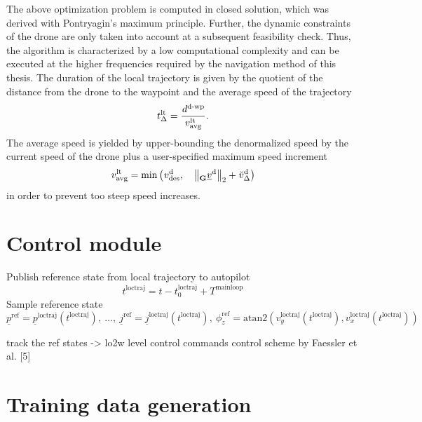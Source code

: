 The above optimization problem is 
computed in closed solution,
which was derived with Pontryagin's maximum principle.
Further, the dynamic constraints of the drone are only taken into account
at a subsequent feasibility check.
Thus, the algorithm is
characterized by a low computational complexity 
and can be executed at the higher frequencies required by the navigation method of this thesis.
The duration of the local trajectory is given by the quotient
of the distance from the drone to the waypoint and 
the average speed of the trajectory
\begin{equation}
    \dur[]{\loctraj}{}{}{}
    = 
    \frac{
        \dist[]{\dronetowayp}{}{}{}
    }{
        \speed[]{\loctraj}{\average}{}{}
    }.
\end{equation}
The average speed is yielded by upper-bounding
the denormalized speed 
by 
the current speed of the drone 
plus a user-specified maximum speed increment
\begin{equation}
    \speed[]{\loctraj}{\average}{}{}
    = 
    \minof{
        \speed[]{\drone}{\desired}{}{}
    }{
        \left\|
            \vel[]{\drone}{}{\grs}{}
        \right\|_2
        + 
        \speed[\user]{\drone}{\Delta}{}{}
    }
\end{equation}
in order to prevent too steep speed increases.


\section{Control module}


Publish reference state from local trajectory to autopilot
\begin{equation}
    t^\text{loctraj} = t - t^\text{loctraj}_0 + T^\text{mainloop}
\end{equation}
Sample reference state
\begin{equation}
    \underline p^\text{ref} = \underline p^\text{loctraj}(t^\text{loctraj})
    ,\ \dots,\ 
    \underline j^\text{ref} = \underline j^\text{loctraj}(t^\text{loctraj})
    ,\ 
    \phi_z^\text{ref} 
    = 
    \mathrm{atan2}\left(
        v_y^\text{loctraj}(t^\text{loctraj})
        ,
        v_x^\text{loctraj}(t^\text{loctraj})
    \right)
\end{equation}


track the ref states -> lo2w level control commands
control scheme by Faessler et al. [5]



\section*{Training data generation}



